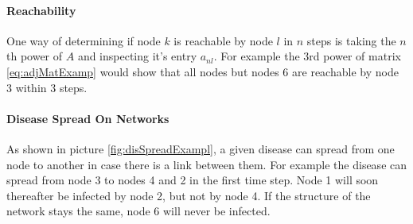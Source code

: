 \paragraph{Reachability}
One way of determining if node $k$ is reachable by node $l$ in $n$ steps is taking the $n$th power of $A$ and inspecting it's entry $a_{nl}$. For example the 3rd power of matrix \ref{eq:adjMatExamp} would show that all nodes but nodes 6 are reachable by node 3 within 3 steps.
\paragraph{Disease Spread On Networks}
As shown in picture \ref{fig:disSpreadExampl}, a given disease can spread from one node to another in case there is a link between them. For example the disease can spread from node 3 to nodes 4 and 2 in the first time step. Node 1 will soon thereafter be infected by node 2, but not by node 4. If the structure of the network stays the same, node 6 will never be infected.
